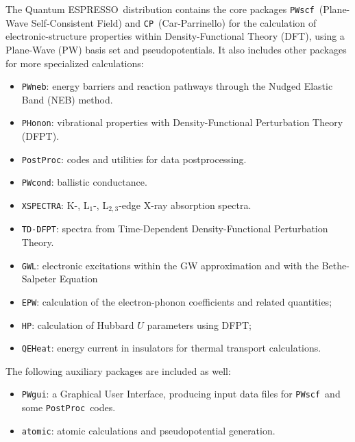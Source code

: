 \documentclass[12pt,a4paper]{article}
\def\qe{{\sc Quantum ESPRESSO}}
\def\PWscf{\texttt{PWscf}}
\def\PHonon{\texttt{PHonon}}
\def\CP{\texttt{CP}}
\def\PostProc{\texttt{PostProc}}
\def\NEB{\texttt{PWneb}}
\begin{document}
The \qe\ distribution contains the core packages \PWscf\ (Plane-Wave
Self-Consistent Field) and \CP\ (Car-Parrinello) for the calculation
of electronic-structure properties within
Density-Functional Theory (DFT), using a Plane-Wave (PW) basis set
and pseudopotentials. It also includes other packages for
more specialized calculations:
\begin{itemize}
  \item \NEB:
        energy barriers and reaction pathways through the Nudged Elastic Band
        (NEB) method.
      \item \PHonon:
        vibrational properties  with Density-Functional Perturbation Theory
        (DFPT).
  \item \PostProc:
        codes and utilities for data postprocessing.
  \item \texttt{PWcond}:
        ballistic conductance.
  \item \texttt{XSPECTRA}:
        K-, L$_1$-, L$_{2,3}$-edge X-ray absorption spectra.
  \item \texttt{TD-DFPT}:
        spectra from Time-Dependent
        Density-Functional Perturbation Theory.
  \item \texttt{GWL}: electronic excitations within the GW approximation
        and with the Bethe-Salpeter Equation
  \item \texttt{EPW}: calculation of the electron-phonon coefficients
        and related quantities;
  \item \texttt{HP}: calculation of Hubbard $U$ parameters using DFPT;
  \item \texttt{QEHeat}: energy current in insulators for thermal
    transport calculations.
\end{itemize}
The following auxiliary packages are included as well:
\begin{itemize}
\item \texttt{PWgui}:
      a Graphical User Interface, producing input data files for
      \PWscf\ and some \PostProc\ codes.
\item \texttt{atomic}:
      atomic calculations and pseudopotential generation.
\end{itemize}
\end{document}
